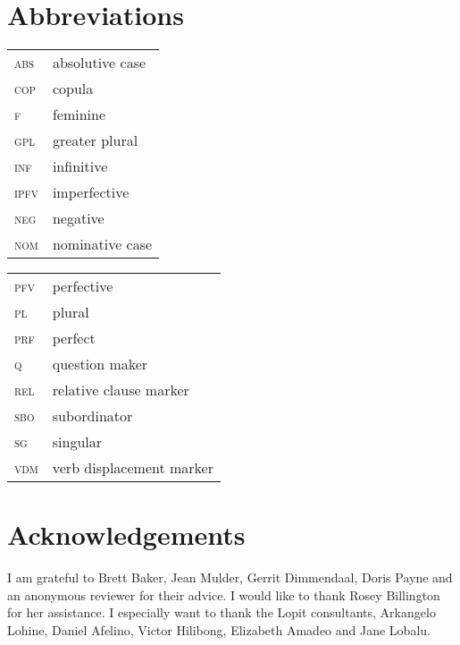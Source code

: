\documentclass[output=paper]{langsci/langscibook}
\begin{document}
\section*{Abbreviations}
\begin{tabularx}{.45\textwidth}{lX}
\textsc{abs} & absolutive case \\

\textsc{cop} & copula \\

\textsc{f} & feminine \\

\textsc{gpl} & greater plural \\

\textsc{inf} & infinitive \\

\textsc{ipfv} & imperfective \\

\textsc{neg} & negative \\

\textsc{nom} & nominative case \\

\end{tabularx}
\begin{tabularx}{.45\textwidth}{lX}

\textsc{pfv} & perfective \\

\textsc{pl} & plural \\

\textsc{prf} & perfect \\

\textsc{q} & question maker \\

\textsc{rel} & relative clause marker \\

\textsc{sbo} &  subordinator \\

\textsc{sg} & singular \\

\textsc{vdm} & verb displacement marker \\
\end{tabularx}

\section*{Acknowledgements}

I am grateful to Brett Baker, Jean Mulder, Gerrit Dimmendaal, Doris Payne and an anonymous reviewer for their advice. I would like to thank Rosey Billington for her assistance. I especially want to thank the Lopit consultants, Arkangelo Lohine, Daniel Afelino, Victor Hilibong, Elizabeth Amadeo and Jane Lobalu.

\printbibliography[heading=subbibliography,notkeyword=this]
\end{document}
